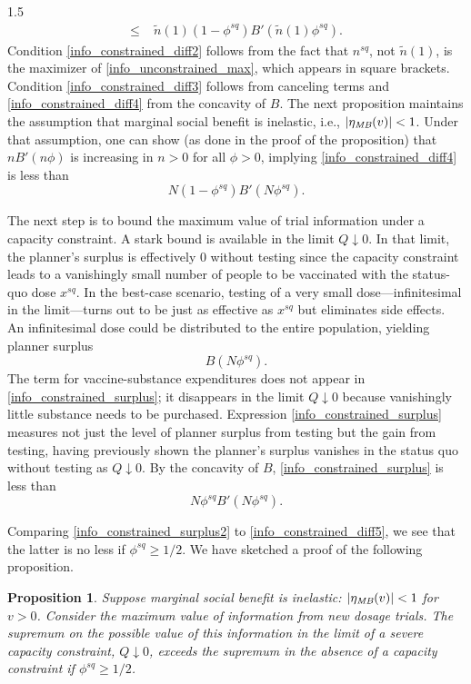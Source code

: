 \documentclass[12pt]{article}
\DeclarePairedDelimiter\abs{\lvert}{\rvert}
\newcommand{\efficacy}{\phi}
\newcommand{\sqdose}{x^{sq}}
\newcommand{\sqefficacy}{\efficacy^{sq}}
\newcommand{\sqnumber}{n^{sq}}
\newcommand{\benefit}{B}
\newcommand{\MB}{\text{\it MB}}
\newcommand{\elasticity}[1]{\eta_{#1}}
\newtheorem{proposition}{Proposition}
\begin{document}
\begin{spacing}{1.5}
\begin{align}
\leq \; & \tilde{n}(1) (1 - \sqefficacy) \benefit'(\tilde{n}(1) \sqefficacy) \label{info_constrained_diff4}. 
\end{align}
Condition \eqref{info_constrained_diff2} follows from the fact that $\sqnumber$, not $\tilde{n}(1)$, is the maximizer of \eqref{info_unconstrained_max}, which appears in square brackets. Condition \eqref{info_constrained_diff3} follows from canceling terms and \eqref{info_constrained_diff4} from the concavity of $\benefit$. The next proposition maintains the assumption that marginal social benefit is inelastic, i.e., $\abs{\elasticity{\MB}(v)} < 1$. Under that assumption, one can show (as done in the proof of the proposition) that $n \benefit'(n \efficacy)$ is increasing in $n > 0$ for all $\efficacy > 0$, implying \eqref{info_constrained_diff4} is less than
\begin{equation}
\label{info_constrained_diff5}
N (1 - \sqefficacy) \benefit'(N \sqefficacy).
\end{equation}

The next step is to bound the maximum value of trial information under a capacity constraint. A stark bound is available in the limit $Q \downarrow 0$. In that limit, the planner's surplus is effectively 0 without testing since the capacity constraint leads to a vanishingly small number of people to be vaccinated with the status-quo dose $\sqdose$. In the best-case scenario, testing of a very small dose---infinitesimal in the limit---turns out to be just as effective as $\sqdose$ but eliminates side effects. An infinitesimal dose could be distributed to the entire population, yielding planner surplus 
\begin{equation}
\label{info_constrained_surplus}
\benefit(N \sqefficacy).
\end{equation}
The term for vaccine-substance expenditures does not appear in \eqref{info_constrained_surplus}; it disappears in the limit $Q \downarrow 0$ because vanishingly little substance needs to be purchased. Expression \eqref{info_constrained_surplus} measures not just the level of planner surplus from testing but the gain from testing, having previously shown the planner's surplus vanishes in the status quo without testing as $Q \downarrow 0$. By the concavity of $\benefit$, \eqref{info_constrained_surplus} is less than 
\begin{equation}
\label{info_constrained_surplus2}
N \sqefficacy \benefit'(N \sqefficacy).
\end{equation}

Comparing \eqref{info_constrained_surplus2} to \eqref{info_constrained_diff5}, we see that the latter is no less if $\sqefficacy \geq 1/2$. We have sketched a proof of the following proposition.
\begin{proposition}
\label{p:infobound}
\singlespace
Suppose marginal social benefit is inelastic: $\abs{\elasticity{\MB}(v)} < 1$ for $v > 0$. Consider the maximum value of information from new dosage trials. The supremum on the possible value of this information in the limit of a severe capacity constraint, $Q \downarrow 0$, exceeds the supremum in the absence of a capacity constraint if $\sqefficacy \geq 1/2$. 
\end{proposition}


\end{spacing}
\end{document}
